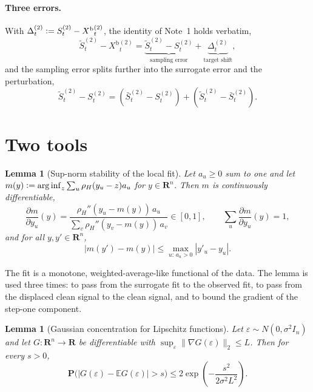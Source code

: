 \documentclass[11pt]{article}
\newcommand{\E}{\mathbb{E}}
\newcommand{\Pp}{\mathbf{P}}
\newcommand{\R}{\mathbf{R}}
\newcommand{\eqdef}{\mathrel{\vcentcolon=}}
\newcommand{\arginf}{\mathop{\mathrm{arg\,inf}}}
\newcommand{\norm}[1]{\lVert#1\rVert}
\newcommand{\IMFs}{S}
\newcommand{\IMFt}{\widetilde S}
\newcommand{\IMFb}{\bar S}
\newcommand{\BiasedSignal}{X^{\mathrm b}}
\newtheorem{lemma}[proposition]{Lemma}
\theoremstyle{definition}
\begin{document}
\paragraph{Three errors.}
With \(\Delta^{(2)}_t\eqdef\IMFs^{(2)}_t-\BiasedSignal{}^{(2)}_t\), the
identity of Note~1 holds verbatim,
\begin{equation}
  \IMFt^{(2)}_t-\BiasedSignal{}^{(2)}_t
  =\underbrace{\IMFt^{(2)}_t-\IMFs^{(2)}_t}_{\text{sampling error}}
   +\underbrace{\Delta^{(2)}_t}_{\text{target shift}},
  \label{eq:step2-identity}
\end{equation}
and the sampling error splits further into the surrogate error and the
perturbation,
\begin{equation}
  \IMFt^{(2)}_t-\IMFs^{(2)}_t
  =(\IMFb^{(2)}_t-\IMFs^{(2)}_t)+(\IMFt^{(2)}_t-\IMFb^{(2)}_t).
  \label{eq:sampling-split}
\end{equation}

\section{Two tools}\label{sec:tools}

\begin{lemma}[Sup-norm stability of the local fit]\label{lem:stability}
Let \(a_u\geq0\) sum to one and let
\(m(y)\eqdef\arginf_z\sum_u\rho_H(y_u-z)a_u\) for \(y\in\R^n\).  Then
\(m\) is continuously differentiable,
\[
  \frac{\partial m}{\partial y_u}(y)
  =\frac{\rho_H''(y_u-m(y))\,a_u}{\sum_v\rho_H''(y_v-m(y))\,a_v}\in[0,1],
  \qquad
  \sum_u\frac{\partial m}{\partial y_u}(y)=1,
\]
and for all \(y,y'\in\R^n\),
\begin{equation}
  |m(y')-m(y)|\leq\max_{u:\,a_u>0}|y'_u-y_u|.
  \label{eq:stability}
\end{equation}
\end{lemma}

The fit is a monotone, weighted-average-like functional of the data.  The
lemma is used three times: to pass from the surrogate fit to the observed
fit, to pass from the displaced clean signal to the clean signal, and to
bound the gradient of the step-one component.

\begin{lemma}[Gaussian concentration for Lipschitz functions]\label{lem:tis}
Let \(\varepsilon\sim N(0,\sigma^2I_n)\) and let \(G:\R^n\to\R\) be
differentiable with \(\sup_\varepsilon\norm{\nabla G(\varepsilon)}_2\leq L\).
Then for every \(s>0\),
\[
  \Pp\bigl(|G(\varepsilon)-\E G(\varepsilon)|>s\bigr)
  \leq2\exp\!\left(-\frac{s^2}{2\sigma^2L^2}\right).
\]
\end{lemma}
\end{document}
